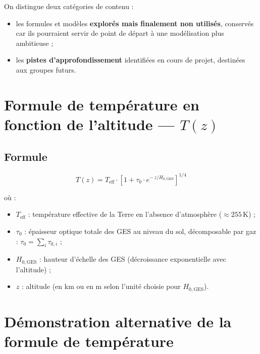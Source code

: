 \documentclass[a4paper,11pt]{article}
\begin{document}
On distingue deux catégories de contenu :
\begin{itemize}
  \item les formules et modèles \textbf{explorés mais finalement non utilisés},
        conservés car ils pourraient servir de point de départ à une modélisation
        plus ambitieuse ;
  \item les \textbf{pistes d'approfondissement} identifiées en cours de projet,
        destinées aux groupes futurs.
\end{itemize}

\section{Formule de température en fonction de l'altitude — \texorpdfstring{$T(z)$}{T(z)}}

\subsection{Formule}

\begin{formule}
\begin{equation}
  T(z) = T_{\mathrm{eff}} \cdot \left[1 + \tau_0 \cdot e^{-\,z/H_{0,\mathrm{GES}}}\right]^{1/4}
  \label{eq:Tz_serre}
\end{equation}
\end{formule}

où :
\begin{itemize}
  \item $T_{\mathrm{eff}}$ : température effective de la Terre en l'absence
        d'atmosphère ($\approx 255\,\mathrm{K}$) ;
  \item $\tau_0$ : épaisseur optique totale des GES au niveau du sol,
        décomposable par gaz : $\tau_0 = \sum_i \tau_{0,i}$ ;
  \item $H_{0,\mathrm{GES}}$ : hauteur d'échelle des GES (décroissance
        exponentielle avec l'altitude) ;
  \item $z$ : altitude (en km ou en m selon l'unité choisie pour $H_{0,\mathrm{GES}}$).
\end{itemize}

\section{Démonstration alternative de la formule de température}
\end{document}
